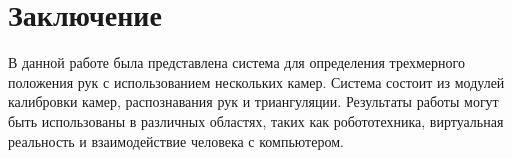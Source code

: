 \documentclass[12pt, a4paper]{article}
\begin{document}
\section{Заключение}

В данной работе была представлена система для определения трехмерного положения рук с использованием нескольких камер. Система состоит из модулей калибровки камер, распознавания рук и триангуляции. Результаты работы могут быть использованы в различных областях, таких как робототехника, виртуальная реальность и взаимодействие человека с компьютером.
\printbibliography
% 
% 
\end{document}
